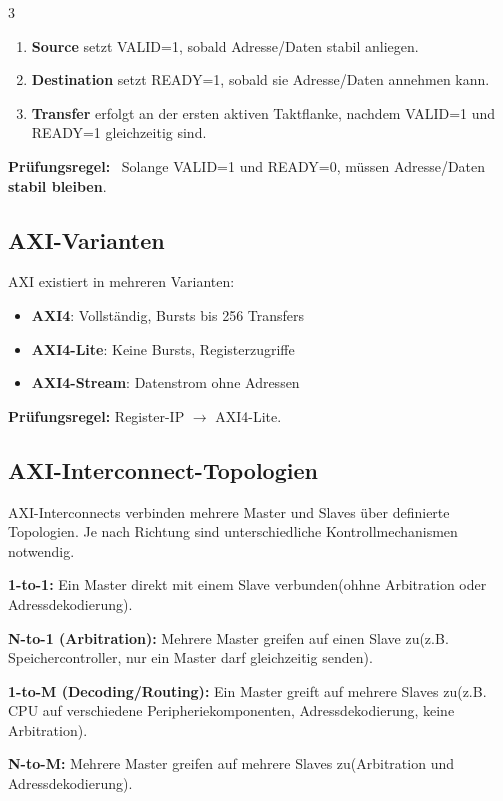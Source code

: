 \documentclass[10pt,a4paper]{article}
\newcommand{\prule}[1]{\textbf{\textcolor{examBlue}{Prüfungsregel:}}~#1}
\newcommand{\hilite}[1]{\colorbox{yellow!25}{#1}}
\newcommand{\imp}[1]{\textbf{\textcolor{codeemph}{#1}}}
\begin{document}
\begin{multicols}{3}
\begin{enumerate}[leftmargin=*,itemsep=0pt,topsep=2pt]
  \item \textbf{Source} setzt \hilite{VALID=1}, sobald Adresse/Daten stabil anliegen.
  \item \textbf{Destination} setzt \hilite{READY=1}, sobald sie Adresse/Daten annehmen kann.
  \item \textbf{Transfer} erfolgt an der \hilite{ersten aktiven Taktflanke}, nachdem \hilite{VALID=1} und \hilite{READY=1} gleichzeitig sind.
\end{enumerate}

\prule{%
Solange \hilite{VALID=1} und \hilite{READY=0}, müssen Adresse/Daten \textbf{stabil bleiben}.
}


\subsection{AXI-Varianten}
AXI existiert in mehreren Varianten:

\begin{itemize}
  \item \textbf{AXI4}: Vollständig, Bursts bis 256 Transfers
  \item \textbf{AXI4-Lite}: Keine Bursts, Registerzugriffe
  \item \textbf{AXI4-Stream}: Datenstrom ohne Adressen
\end{itemize}

\imp{Prüfungsregel:}  
\hilite{Register-}\hilite{IP} $\rightarrow$ \hilite{AXI4-Lite}.

\subsection{AXI-Interconnect-Topologien}

AXI-Interconnects verbinden mehrere Master und Slaves über definierte Topologien.
Je nach Richtung sind unterschiedliche Kontrollmechanismen notwendig.

\textbf{1-to-1:}
Ein Master direkt mit einem Slave verbunden(ohhne Arbitration oder Adressdekodierung).


\textbf{N-to-1 (Arbitration):}
Mehrere Master greifen auf einen Slave zu(z.B. Speichercontroller, nur ein Master darf gleichzeitig senden).


\textbf{1-to-M (Decoding/Routing):}
Ein Master greift auf mehrere Slaves zu(z.B. CPU auf verschiedene Peripheriekomponenten, Adressdekodierung, keine Arbitration).

\textbf{N-to-M:}
Mehrere Master greifen auf mehrere Slaves zu(Arbitration und Adressdekodierung).


\end{multicols}
\end{document}

